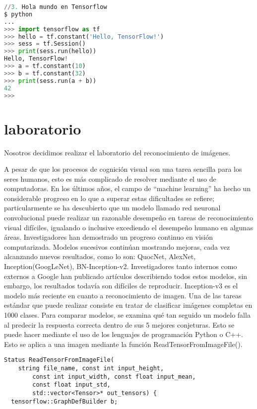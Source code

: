 \documentclass[11pt]{article}
\begin{document}
\begin{lstlisting}[language=python]
//3. Hola mundo en Tensorflow
$ python
...
>>> import tensorflow as tf
>>> hello = tf.constant('Hello, TensorFlow!')
>>> sess = tf.Session()
>>> print(sess.run(hello))
Hello, TensorFlow!
>>> a = tf.constant(10)
>>> b = tf.constant(32)
>>> print(sess.run(a + b))
42
>>>
\end{lstlisting}
\newpage
\section{laboratorio}
Nosotros decidimos realizar el laboratorio del reconocimiento de imágenes.

A pesar de que los procesos de cognición visual son una tarea sencilla para los seres humanos, esto es más complicado de resolver mediante el uso de computadoras. En los últimos años, el campo de “machine learning” ha hecho un considerable progreso en lo que a superar estas dificultades se refiere; particularmente se ha descubierto que un modelo llamado red neuronal convolucional puede realizar un razonable desempeño en tareas de reconocimiento visual difíciles, igualando o inclusive excediendo el desempeño humano en algunas áreas.
Investigadores han demostrado un progreso continuo en visión computarizada. Modelos sucesivos continúan mostrando mejoras, cada vez alcanzando nuevos resultados, como lo son: QuocNet, AlexNet, Inception(GoogLeNet), BN-Inception-v2. Investigadores tanto internos como externos a Google han publicado artículos describiendo todos estos modelos, sin embargo, los resultados todavía son difíciles de reproducir.
Inception-v3 es el modelo más reciente en cuanto a reconocimiento de imagen. Una de las tareas estándar que puede realizar consiste en tratar de clasificar imágenes completas en 1000 clases. Para comparar modelos, se examina qué tan seguido un modelo falla al predecir la respuesta correcta dentro de sus 5 mejores conjeturas. Esto se puede hacer mediante el uso de los lenguajes de programación Python o C++.
Esto se aplica a una imagen mediante la función ReadTensorFromImageFile().

\begin{lstlisting}
Status ReadTensorFromImageFile(
	string file_name, const int input_height,
    	const int input_width, const float input_mean,
    	const float input_std,
        std::vector<Tensor>* out_tensors) {
  tensorflow::GraphDefBuilder b;

\end{lstlisting}
\end{document}
